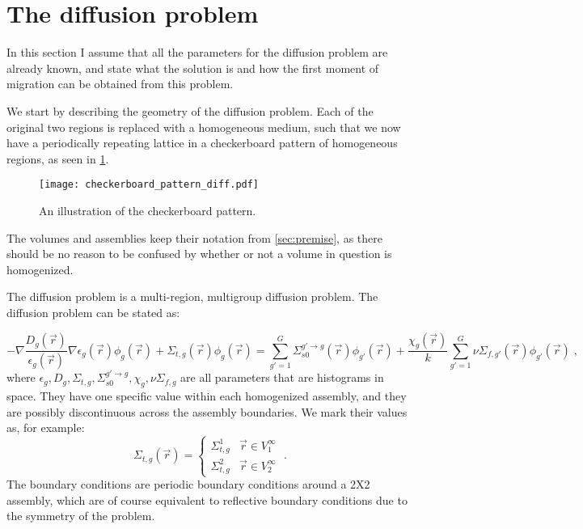 \documentclass[a4paper,letterpaper,12pt,oneside,draft]{article}
\newcommand{\eec}{\;,}
\newcommand{\eep}{\;.}
\newcommand{\vr}{\ensuremath{\vec{r}}}
\begin{document}
\section{The diffusion problem}\label{sec:diffusion}
    In this section I assume that all the parameters for the diffusion problem are already known, and state what the solution is and how the first moment of migration can be obtained from this problem.
    
    We start by describing the geometry of the diffusion problem. Each of the original two regions is replaced with a homogeneous medium, such that we now have a periodically repeating lattice in a checkerboard pattern of homogeneous regions, as seen in \cref{fig:checkerboard:diffusion}.
    \begin{figure}[H]
        \centering
        \texttt{[image: checkerboard\_pattern\_diff.pdf]}
        \caption{An illustration of the checkerboard pattern.}\label{fig:checkerboard:diffusion}
    \end{figure}
    The volumes and assemblies keep their notation from \cref{sec:premise}, as there should be no reason to be confused by whether or not a volume in question is homogenized.

    The diffusion problem is a multi-region, multigroup diffusion problem. The diffusion problem can be stated as:
    
    \begin{equation}
    \label{eq:DE}
        -\nabla \frac{D_g(\vr)}{\epsilon_g(\vr)}\nabla\epsilon_g(\vr)\phi_g(\vr) +
        \Sigma_{t,g}(\vr)\phi_g(\vr) = 
        \sum_{g'=1}^G \Sigma_{s0}^{g'\to g}(\vr)\phi_{g'}(\vr) + \frac{\chi_g(\vr)}{k}\sum_{g'=1}^{G}\nu\Sigma_{f,g'}(\vr)\phi_{g'}(\vr)\eec
    \end{equation}
    where $\epsilon_g,D_g,\Sigma_{t,g},\Sigma_{s0}^{g'\to g},\chi_g,\nu\Sigma_{f,g}$ are all parameters that are histograms in space.
    They have one specific value within each homogenized assembly, and they are possibly discontinuous across the assembly boundaries. We mark their values as, for example:
    \begin{equation}
    \label{eq:TotalHomogenized}
        \Sigma_{t,g}(\vr) = 
        \begin{cases}
            \Sigma_{t,g}^1 & \vr \in V_1^\infty \\
            \Sigma_{t,g}^2 & \vr \in V_2^\infty
        \end{cases}\eep
    \end{equation}
    The boundary conditions are periodic boundary conditions around a 2X2 assembly, which are of course equivalent to reflective boundary conditions due to the symmetry of the problem.
    
\end{document}

